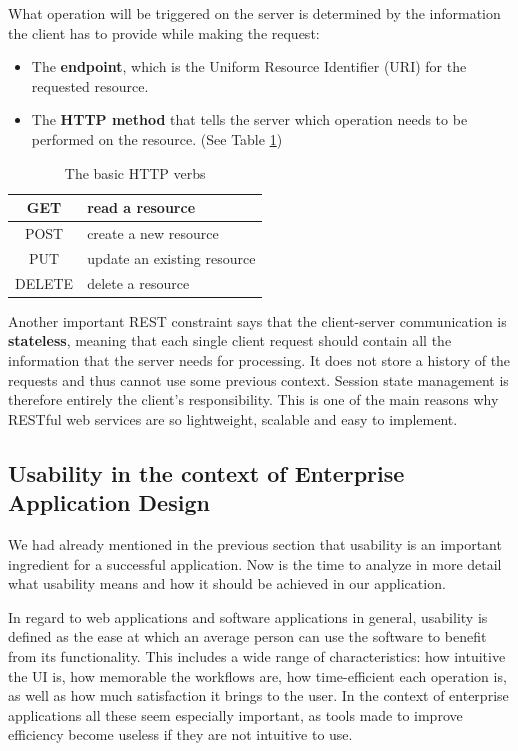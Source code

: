 What operation will be triggered on the server is determined by the information the client has to provide while making the request:

\begin{itemize}
  \item The \textbf{endpoint}, which is the Uniform Resource Identifier (URI) for the requested resource.
  \item The \textbf{HTTP method} that tells the server which operation needs to be performed on the resource. (See Table \ref{httpVerbs})
\end{itemize}

\begin{table}[H]
  \centering
  \begin{tabular}{|c|l|}
    \hline
    GET    & read a resource             \\ \hline
    POST   & create a new resource       \\ \hline
    PUT    & update an existing resource \\ \hline
    DELETE & delete a resource           \\ \hline
  \end{tabular}
  \caption{The basic HTTP verbs}
  \label{httpVerbs}
\end{table}

Another important REST constraint says that the client-server communication is \textbf{stateless}, meaning that each single client request should contain all the information that the server needs for processing. It does not store a history of the requests and thus cannot use some previous context. Session state management is therefore entirely the client's responsibility. This is one of the main reasons why RESTful web services are so lightweight, scalable and easy to implement.


\subsection{Usability in the context of Enterprise Application Design}
\label{subsection:usability}


We had already mentioned in the previous section that usability is an important ingredient for a successful application. Now is the time to analyze in more detail what usability means and how it should be achieved in our application.

In regard to web applications and software applications in general, usability is defined as the ease at which an average person can use the software to benefit from its functionality. This includes a wide range of characteristics: how intuitive the UI is, how memorable the workflows are, how time-efficient each operation is, as well as how much satisfaction it brings to the user. In the context of enterprise applications all these seem especially important, as tools made to improve efficiency become useless if they are not intuitive to use.

